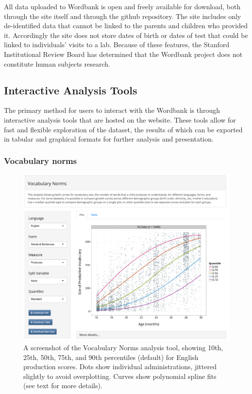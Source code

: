 \documentclass[doc,noapacite]{apa2}
\begin{document}
All data uploaded to Wordbank is open and freely available for download, both through the site itself and through the github repository. The site includes only de-identified data that cannot be linked to the parents and children who provided it. Accordingly the site does not store dates of birth or dates of test that could be linked to individuals' visits to a lab. Because of these features, the Stanford Institutional Review Board has determined that the Wordbank project does not constitute human subjects research.

\subsection{Interactive Analysis Tools}

The primary method for users to interact with the Wordbank is through interactive analysis tools that are hosted on the website. These tools allow for fast and flexible exploration of the dataset, the results of which can be exported in tabular and graphical formats for further analysis and presentation. 

\subsubsection{Vocabulary norms}

\begin{figure}[t]
\includegraphics[width=6in]{figures/normsapp.png}
\caption{\label{fig:norms} A screenshot of the Vocabulary Norms analysis tool, showing 10th, 25th, 50th, 75th, and 90th percentiles (default) for English production scores. Dots show individual administrations, jittered slightly to avoid overplotting. Curves show polynomial spline fits (see text for more details).}
\end{figure}
\end{document}
